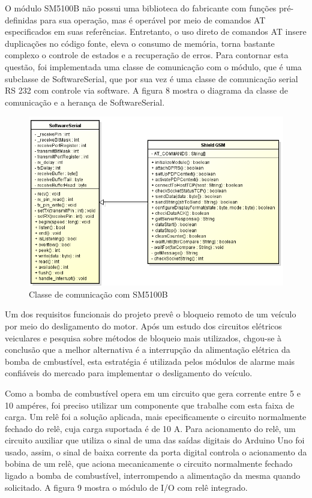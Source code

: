 O módulo SM5100B não possui uma biblioteca do fabricante com funções pré-definidas para sua 
operação, mas é operável por meio de comandos AT especificados em suas referências. Entretanto,
o uso direto de comandos AT insere duplicações no código fonte, eleva o consumo de memória,
torna bastante complexo o controle de estados e a recuperação de erros. Para contornar esta questão,
foi implementada uma classe de comunicação com o módulo, que é uma subclasse de SoftwareSerial, que por
sua vez é uma classe de comunicação serial RS 232 com controle via software. A figura 8 mostra o diagrama
da classe de comunicação e a herança de SoftwareSerial.

\begin{figure}[!htb]
	\centering
	\includegraphics[width=9.00cm\textwidth]{figures/lib_gsm.png}
	\caption{Classe de comunicação com SM5100B}
	\label{Figura 8}
\end{figure}

Um dos requisitos funcionais do projeto prevê o bloqueio remoto de um veículo por meio do desligamento 
do motor. Após um estudo dos circuitos elétricos veiculares e pesquisa sobre métodos de bloqueio mais
utilizados, chgou-se à conclusão que a melhor alternativa é a interrupção da alimentação elétrica
da bomba de cmbustível, esta estratégia é utilizada pelos módulos de alarme mais confiáveis do mercado
para implementar o desligamento do veículo.

Como a bomba de combustível opera em um circuito que gera corrente entre 5 e 10 ampéres, foi preciso
utilizar um componente que trabalhe com esta faixa de carga. Um relê foi a solução aplicada, mais epecificamente
o circuito normalmente fechado do relê, cuja carga suportada é de 10 A. Para acionamento do relê, um circuito
auxiliar que utiliza o sinal de uma das saídas digitais do Arduino Uno foi usado, assim, o sinal de baixa corrente
da porta digital controla o acionamento da bobina de um relê, que aciona mecanicamente o circuito normalmente fechado
ligado a bomba de combustível, interrompendo a alimentação da mesma quando solicitado. A figura 9 mostra o módulo de
I/O com relê integrado.

